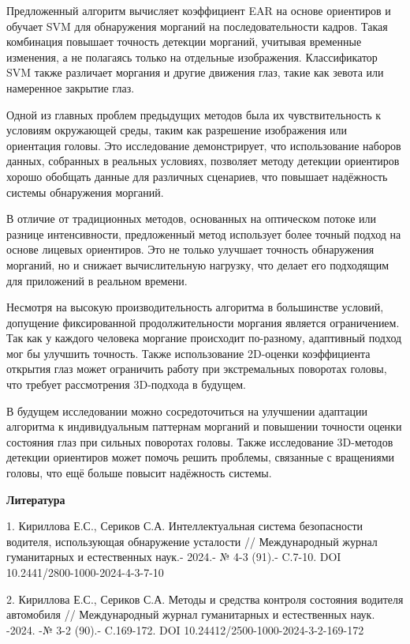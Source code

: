 Предложенный алгоритм вычисляет коэффициент EAR на основе ориентиров и
обучает SVM для обнаружения морганий на последовательности кадров. Такая
комбинация повышает точность детекции морганий, учитывая временные
изменения, а не полагаясь только на отдельные изображения. Классификатор
SVM также различает моргания и другие движения глаз, такие как зевота
или намеренное закрытие глаз.

Одной из главных проблем предыдущих методов была их чувствительность к
условиям окружающей среды, таким как разрешение изображения или
ориентация головы. Это исследование демонстрирует, что использование
наборов данных, собранных в реальных условиях, позволяет методу детекции
ориентиров хорошо обобщать данные для различных сценариев, что повышает
надёжность системы обнаружения морганий.

В отличие от традиционных методов, основанных на оптическом потоке или
разнице интенсивности, предложенный метод использует более точный подход
на основе лицевых ориентиров. Это не только улучшает точность
обнаружения морганий, но и снижает вычислительную нагрузку, что делает
его подходящим для приложений в реальном времени.

Несмотря на высокую производительность алгоритма в большинстве условий,
допущение фиксированной продолжительности моргания является
ограничением. Так как у каждого человека моргание происходит по-разному,
адаптивный подход мог бы улучшить точность. Также использование
2D-оценки коэффициента открытия глаз может ограничить работу при
экстремальных поворотах головы, что требует рассмотрения 3D-подхода в
будущем.

В будущем исследовании можно сосредоточиться на улучшении адаптации
алгоритма к индивидуальным паттернам морганий и повышении точности
оценки состояния глаз при сильных поворотах головы. Также исследование
3D-методов детекции ориентиров может помочь решить проблемы, связанные с
вращениями головы, что ещё больше повысит надёжность системы.

{\bfseries Литература}

1. Кириллова Е.С., Сериков С.А. Интеллектуальная система безопасности
водителя, использующая обнаружение усталости // Международный журнал
гуманитарных и естественных наук.- 2024.- № 4-3 (91).- C.7-10. DOI
10.2441/2800-1000-2024-4-3-7-10

2. Кириллова Е.С., Сериков С.А. Методы и средства контроля состояния
водителя автомобиля // Международный журнал гуманитарных и естественных
наук. -2024. -№ 3-2 (90).- C.169-172. DOI
10.24412/2500-1000-2024-3-2-169-172

